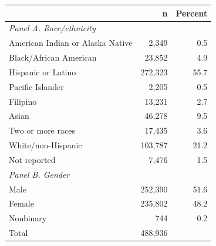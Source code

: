 
\begin{tabular}{@{}lrr@{}}
\toprule
& n & Percent \\
\midrule
\emph{Panel A. Race/ethnicity} & & \\
\quad American Indian or Alaska Native & 2,349 & 0.5 \\
\quad Black/African American & 23,852 & 4.9 \\
\quad Hispanic or Latino & 272,323 & 55.7 \\
\quad Pacific Islander & 2,205 & 0.5 \\
\quad Filipino & 13,231 & 2.7 \\
\quad Asian & 46,278 & 9.5 \\
\quad Two or more races & 17,435 & 3.6 \\
\quad White/non-Hispanic & 103,787 & 21.2 \\
\quad Not reported & 7,476 & 1.5 \\
\emph{Panel B. Gender} & & \\
\quad Male & 252,390 & 51.6 \\
\quad Female & 235,802 & 48.2 \\
\quad Nonbinary & 744 & 0.2 \\
\midrule
Total & 488,936 & \\
\bottomrule\bottomrule
\end{tabular}
